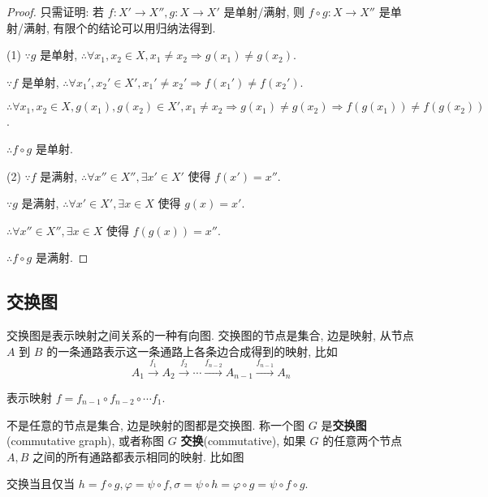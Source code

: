 \documentclass[color=black,device=normal,lang=cn,mode=geye]{elegantnote}
\begin{document}
\begin{proof}
    只需证明: 若 $f:X'\to X'',g:X\to X'$ 是单射/满射, 则 $f\circ g:X\to X''$ 是单射/满射, 有限个的结论可以用归纳法得到.

    (1) $\because g$ 是单射, $\therefore\forall x_1,x_2\in X,x_1\neq x_2\Rightarrow g(x_1)\neq g(x_2)$.
    
    $\because f$ 是单射, $\therefore\forall x_1',x_2'\in X',x_1'\neq x_2'\Rightarrow f(x_1')\neq f(x_2')$.

    $\therefore\forall x_1,x_2\in X,g(x_1),g(x_2)\in X',x_1\neq x_2\Rightarrow g(x_1)\neq g(x_2)\Rightarrow f(g(x_1))\neq f(g(x_2))$.

    $\therefore f\circ g$ 是单射.

    (2) $\because f$ 是满射, $\therefore\forall x''\in X'',\exists x'\in X'$ 使得 $f(x')=x''$.

    $\because g$ 是满射, $\therefore\forall x'\in X',\exists x\in X$ 使得 $g(x)=x'$.

    $\therefore\forall x''\in X'',\exists x\in X$ 使得 $f(g(x))=x''$.

    $\therefore f\circ g$ 是满射.
\end{proof}
\subsection{交换图}
交换图是表示映射之间关系的一种有向图. 交换图的节点是集合, 边是映射, 从节点 $A$ 到 $B$ 的一条通路表示这一条通路上各条边合成得到的映射, 比如
\[A_1\xrightarrow{f_1}A_2\xrightarrow{f_2}\cdots\xrightarrow{f_{n-2}}A_{n-1}\xrightarrow{f_{n-1}}A_n\]

表示映射 $f=f_{n-1}\circ f_{n-2}\circ\cdots f_1$.

不是任意的节点是集合, 边是映射的图都是交换图. 称一个图 $G$ 是\textbf{交换图}(commutative graph), 或者称图 $G$ \textbf{交换}(commutative), 如果 $G$ 的任意两个节点 $A,B$ 之间的所有通路都表示相同的映射. 比如图
\begin{center}
\end{center}
交换当且仅当 $h=f\circ g,\varphi=\psi\circ f,\sigma=\psi\circ h=\varphi\circ g=\psi\circ f\circ g$.
\end{document}
